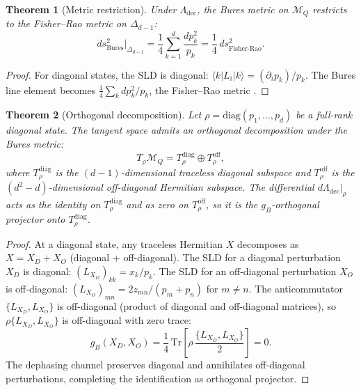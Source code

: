 \documentclass[12pt,a4paper]{article}
\newtheorem{theorem}{Theorem}[section]
\theoremstyle{definition}
\theoremstyle{remark}
\begin{document}
\begin{theorem}[Metric restriction]
\label{thm:metric-restriction}
Under $\Lambda_{\mathrm{dec}}$, the Bures metric on $\mathcal{M}_Q$ restricts to the Fisher--Rao metric on $\Delta_{d-1}$:
\begin{equation}
\label{eq:metric-restriction}
ds^2_{\mathrm{Bures}}\big|_{\Delta_{d-1}} = \frac{1}{4} \sum_{k=1}^d \frac{dp_k^2}{p_k} = \frac{1}{4}\, ds^2_{\mathrm{Fisher\text{-}Rao}}.
\end{equation}
\end{theorem}

\begin{proof}
For diagonal states, the SLD is diagonal: $\langle k|L_i|k\rangle = (\partial_i p_k)/p_k$. The Bures line element becomes $\frac{1}{4}\sum_k dp_k^2/p_k$, the Fisher--Rao metric \cite{braunstein1994statistical}.
\end{proof}

\begin{theorem}[Orthogonal decomposition]
\label{thm:orthogonal-decomposition}
Let $\rho = \mathrm{diag}(p_1, \ldots, p_d)$ be a full-rank diagonal state. The tangent space admits an orthogonal decomposition under the Bures metric:
\begin{equation}
\label{eq:orthogonal-decomposition}
T_\rho \mathcal{M}_Q = T_\rho^{\mathrm{diag}} \oplus T_\rho^{\mathrm{off}},
\end{equation}
where $T_\rho^{\mathrm{diag}}$ is the $(d{-}1)$-dimensional traceless diagonal subspace and $T_\rho^{\mathrm{off}}$ is the $(d^2{-}d)$-dimensional off-diagonal Hermitian subspace. The differential $d\Lambda_{\mathrm{dec}}|_\rho$ acts as the identity on $T_\rho^{\mathrm{diag}}$ and as zero on $T_\rho^{\mathrm{off}}$, so it is the $g_B$-orthogonal projector onto $T_\rho^{\mathrm{diag}}$.
\end{theorem}

\begin{proof}
At a diagonal state, any traceless Hermitian $X$ decomposes as $X = X_D + X_O$ (diagonal + off-diagonal). The SLD for a diagonal perturbation $X_D$ is diagonal: $(L_{X_D})_{kk} = x_k/p_k$. The SLD for an off-diagonal perturbation $X_O$ is off-diagonal: $(L_{X_O})_{mn} = 2z_{mn}/(p_m + p_n)$ for $m \neq n$. The anticommutator $\{L_{X_D}, L_{X_O}\}$ is off-diagonal (product of diagonal and off-diagonal matrices), so $\rho \{L_{X_D}, L_{X_O}\}$ is off-diagonal with zero trace:
\[
g_B(X_D, X_O) = \frac{1}{4}\,\mathrm{Tr}\!\left[\rho\,\frac{\{L_{X_D}, L_{X_O}\}}{2}\right] = 0.
\]
The dephasing channel preserves diagonal and annihilates off-diagonal perturbations, completing the identification as orthogonal projector.
\end{proof}
\end{document}
